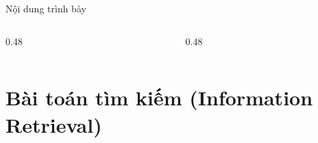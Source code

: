\documentclass[aspectratio=169, 11pt]{beamer}
\begin{document}
\begin{frame}{Nội dung trình bày}
\begin{columns}[T]
\begin{column}{0.48\textwidth}
\tableofcontents[sections={1-3}]
\end{column}
\begin{column}{0.48\textwidth}
\tableofcontents[sections={4-6}]
\end{column}
\end{columns}
\end{frame}

\section{Bài toán tìm kiếm (Information Retrieval)}
\end{document}

